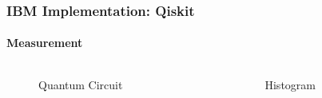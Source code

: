 \begin{frame}[fragile]{}
	\frametitle{IBM Implementation: Qiskit}
	\framesubtitle{Measurement}
	\begin{columns}
		\begin{column}{0.75\textwidth}
			\begin{figure}
				\caption{Quantum Circuit}
			\end{figure}
		\end{column}
		\begin{column}{0.25\textwidth}  
			\begin{figure}
				\caption{Histogram}
			\end{figure}
		\end{column}
	\end{columns}
\end{frame}	

